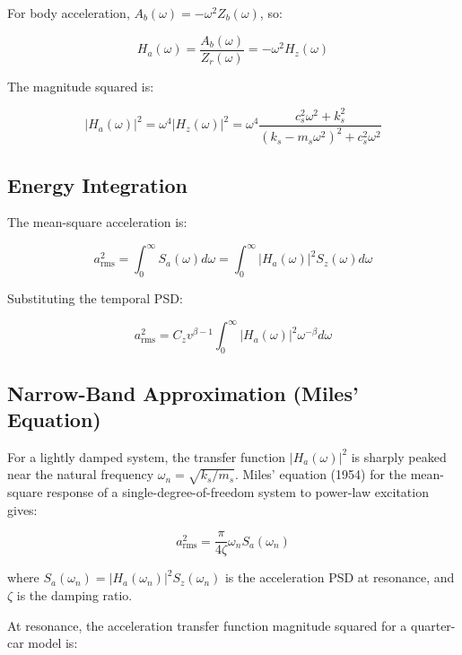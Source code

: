 \documentclass[11pt]{article}
\begin{document}
For body acceleration, $A_b(\omega) = -\omega^2 Z_b(\omega)$, so:

\begin{equation}
H_a(\omega) = \frac{A_b(\omega)}{Z_r(\omega)} = -\omega^2 H_z(\omega)
\end{equation}

The magnitude squared is:

\begin{equation}
|H_a(\omega)|^2 = \omega^4 |H_z(\omega)|^2 = \omega^4 \frac{c_s^2 \omega^2 + k_s^2}{(k_s - m_s \omega^2)^2 + c_s^2 \omega^2}
\end{equation}

\subsection{Energy Integration}

The mean-square acceleration is:

\begin{equation}
a_{\text{rms}}^2 = \int_0^\infty S_a(\omega) d\omega = \int_0^\infty |H_a(\omega)|^2 S_z(\omega) d\omega
\end{equation}

Substituting the temporal PSD:

\begin{equation}
a_{\text{rms}}^2 = C_z v^{\beta-1} \int_0^\infty |H_a(\omega)|^2 \omega^{-\beta} d\omega
\end{equation}

\subsection{Narrow-Band Approximation (Miles' Equation)}

For a lightly damped system, the transfer function $|H_a(\omega)|^2$ is sharply peaked near the natural frequency $\omega_n = \sqrt{k_s/m_s}$. Miles' equation (1954) for the mean-square response of a single-degree-of-freedom system to power-law excitation gives:

\begin{equation}
a_{\text{rms}}^2 = \frac{\pi}{4\zeta} \omega_n S_a(\omega_n)
\end{equation}

where $S_a(\omega_n) = |H_a(\omega_n)|^2 S_z(\omega_n)$ is the acceleration PSD at resonance, and $\zeta$ is the damping ratio.

At resonance, the acceleration transfer function magnitude squared for a quarter-car model is:
\end{document}
